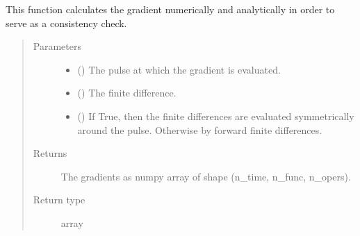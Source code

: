 \documentclass[letterpaper,10pt,english]{sphinxmanual}
\begin{document}
\begin{fulllineitems}
\begin{fulllineitems}
\label{\detokenize{qsim:qsim.simulator.Simulator.numeric_gradient}}
This function calculates the gradient numerically and analytically
in order to serve as a consistency check.
\begin{quote}\begin{description}
\item[{Parameters}] \leavevmode\begin{itemize}
\item {} 
 () \textendash{} The pulse at which the gradient is evaluated.

\item {} 
 () \textendash{} The finite difference.

\item {} 
 () \textendash{} If True, then the finite differences are evaluated symmetrically
around the pulse. Otherwise by forward finite differences.

\end{itemize}

\item[{Returns}] \leavevmode
{} \textendash{} The gradients as numpy array of shape (n\_time, n\_func, n\_opers).

\item[{Return type}] \leavevmode
array

\end{description}\end{quote}

\end{fulllineitems}



\end{fulllineitems}
\end{document}
